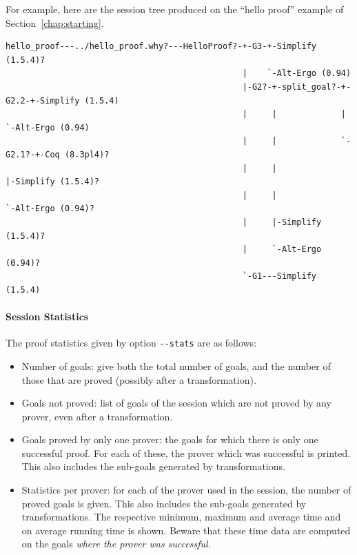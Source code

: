 For example, here are the session tree produced on the ``hello
proof'' example of Section~\ref{chap:starting}.
{\scriptsize
\begin{verbatim}
hello_proof---../hello_proof.why?---HelloProof?-+-G3-+-Simplify (1.5.4)?
                                                |    `-Alt-Ergo (0.94)
                                                |-G2?-+-split_goal?-+-G2.2-+-Simplify (1.5.4)
                                                |     |             |      `-Alt-Ergo (0.94)
                                                |     |             `-G2.1?-+-Coq (8.3pl4)?
                                                |     |                     |-Simplify (1.5.4)?
                                                |     |                     `-Alt-Ergo (0.94)?
                                                |     |-Simplify (1.5.4)?
                                                |     `-Alt-Ergo (0.94)?
                                                `-G1---Simplify (1.5.4)
\end{verbatim}
}

\paragraph{Session Statistics}

The proof statistics given by option \verb|--stats| are as follows:
\begin{itemize}
\item Number of goals: give both the total number of goals, and the
  number of those that are proved (possibly after a transformation).
\item Goals not proved: list of goals of the session which are not
  proved by any prover, even after a transformation.
\item Goals proved by only one prover: the goals for which there is only
  one successful proof. For each of these, the prover which was
  successful is printed. This also includes the sub-goals generated by
  transformations.
\item Statistics per prover: for each of the prover used in the
  session, the number of proved goals is given. This also includes the
  sub-goals generated by transformations. The respective minimum,
  maximum and average time and on average running time is
  shown. Beware that these time data are computed on the
  goals \emph{where the prover was successful}.
\end{itemize}

